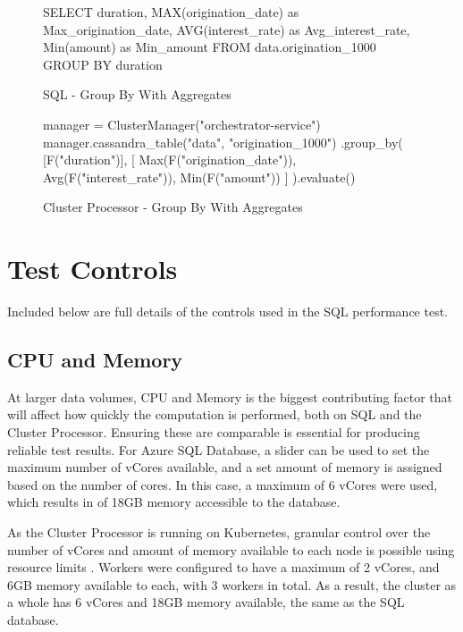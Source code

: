 \begin{figure}[htp]
	\centering
	\begin{SQL}
SELECT 
duration, 
MAX(origination_date) as Max_origination_date, 
AVG(interest_rate) as Avg_interest_rate, 
Min(amount) as Min_amount 
FROM data.origination_1000 
GROUP BY duration
	\end{SQL}
	\caption{SQL - Group By With Aggregates}
	\label{fig:sql-group-by-complex}
\end{figure}

\begin{figure}[htp]
	\begin{python}
manager = ClusterManager("orchestrator-service")
manager.cassandra_table("data", "origination_1000")
.group_by(
[F("duration")],
[	Max(F("origination_date")), 
Avg(F("interest_rate")), 
Min(F("amount"))
]
).evaluate()
	\end{python}
	\caption{Cluster Processor - Group By With Aggregates}
	\label{fig:cluster-group-by-complex}
\end{figure}

\pagebreak
\section{Test Controls}\label{sec:test-controls}

Included below are full details of the controls used in the SQL performance test.

\subsection{CPU and Memory}
At larger data volumes, CPU and Memory is the biggest contributing factor that will affect how quickly the computation is performed, both on SQL and the Cluster Processor. Ensuring these are comparable is essential for producing reliable test results. For Azure SQL Database, a slider can be used to set the maximum number of vCores available, and a set amount of memory is assigned based on the number of cores. In this case, a maximum of 6 vCores were used, which results in of 18GB memory accessible to the database.

As the Cluster Processor is running on Kubernetes, granular control over the number of vCores and amount of memory available to each node is possible using resource limits \cite{k8sapi}. Workers were configured to have a maximum of 2 vCores, and 6GB memory available to each, with 3 workers in total. As a result, the cluster as a whole has 6 vCores and 18GB memory available, the same as the SQL database.

